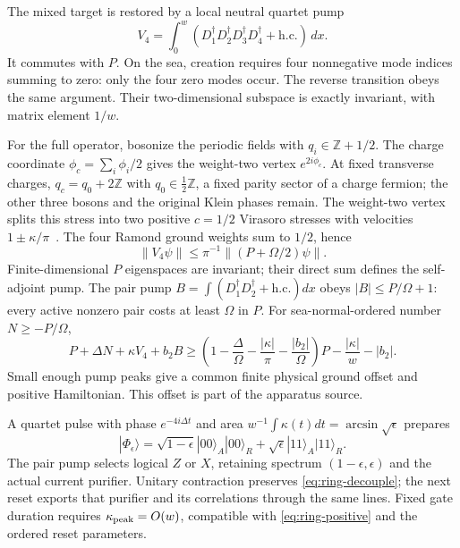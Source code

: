 The mixed target is restored by a local neutral quartet pump
\begin{equation}
 V_4=\int_0^w(D_1^\dagger D_2^\dagger D_3^\dagger D_4^\dagger
                          +\mathrm{h.c.})\,dx .
\end{equation}
It commutes with $P$. On the sea, creation requires four nonnegative
mode indices summing to zero: only the four zero modes occur. The
reverse transition obeys the same argument. Their two-dimensional
subspace is exactly invariant, with matrix element $1/w$.

For the full operator, bosonize the periodic fields with
$q_i\in\mathbb Z+1/2$. The charge coordinate
$\phi_c=\sum_i\phi_i/2$ gives the weight-two vertex $e^{2i\phi_c}$.
At fixed transverse charges, $q_c=q_0+2\mathbb Z$ with
$q_0\in\tfrac12\mathbb Z$, a fixed parity sector of a charge fermion;
the other three bosons and the original Klein phases remain. The
weight-two vertex splits this stress into two positive $c=1/2$
Virasoro stresses with velocities $1\pm\kappa/\pi$~\cite{Naud1999}.
The four Ramond ground weights sum to $1/2$, hence
\begin{equation}
 \|V_4\psi\|\le\pi^{-1}\|(P+\Omega/2)\psi\|.
\end{equation}
Finite-dimensional $P$ eigenspaces are invariant; their direct sum
defines the self-adjoint pump. The pair pump
$B=\int(D_1^\dagger D_2^\dagger+\mathrm{h.c.})dx$ obeys
$|B|\le P/\Omega+1$: every active nonzero pair costs at least
$\Omega$ in $P$. For sea-normal-ordered number $N\ge-P/\Omega$,
\begin{equation}
 P+\Delta N+\kappa V_4+b_2B\ge
 \left(1-\frac\Delta\Omega-\frac{|\kappa|}\pi
                        -\frac{|b_2|}\Omega\right)P
                           -\frac{|\kappa|}{w}-|b_2|.
 \label{eq:ring-positive}
\end{equation}
Small enough pump peaks give a common finite physical ground offset
and positive Hamiltonian. This offset is part of the apparatus source.

A quartet pulse with phase $e^{-4i\Delta t}$ and area
$w^{-1}\int\kappa(t)dt=\arcsin\sqrt\epsilon$ prepares
\begin{equation}
 |\Phi_\epsilon\rangle=\sqrt{1-\epsilon}|00\rangle_A|00\rangle_R
                       +\sqrt\epsilon|11\rangle_A|11\rangle_R.
\end{equation}
The pair pump selects logical $Z$ or $X$, retaining spectrum
$(1-\epsilon,\epsilon)$ and the actual current purifier. Unitary
contraction preserves \eqref{eq:ring-decouple}; the next reset exports
that purifier and its correlations through the same lines. Fixed gate
duration requires $\kappa_{\rm peak}=O(w)$, compatible with
\eqref{eq:ring-positive} and the ordered reset parameters.

